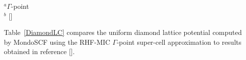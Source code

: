 \documentclass[prb,aps,nobibnotes,twocolumn,doublespace,twocolumngrid,superbib]{revtex4}
\begin{document}
\begin{table}[ht]
\caption{Lattice Constants in angstoms for the Diamond System for different 
system sizes, theory levels, and basis sets at a loose tolerance. For comparision, 
the  experimental value for diamond calculated at zero Kelvin is 
${\rm a}_0 = 3.567$\AA \cite{YTouloukian77}, whereas the most current {\it ab initio} result 
using a Meta-GGA functional \cite{JTao03} is ${\rm a}_0 = 3.583$\AA.
\cite{VStaroverov04}.}
\label{DiamondLC}
\raggedright{
{\hskip 0.33in}$^a \Gamma$-point\\
{\hskip 0.33in}$^b$ []\\}
\end{table}

Table~\ref{DiamondLC}  compares the uniform diamond lattice potential computed 
by MondoSCF using the RHF-MIC $\Gamma$-point super-cell approximation to results obtained in 
reference [].


\end{document}
